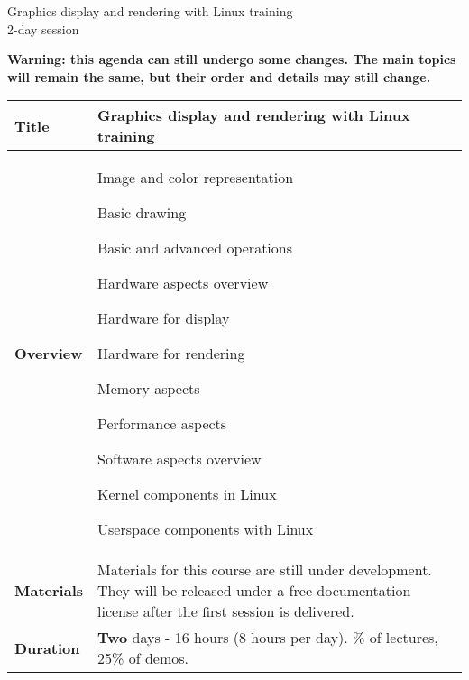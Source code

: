 \documentclass[a4paper,12pt,obeyspaces,spaces,hyphens]{article}
\begin{document}
\thispagestyle{fancy}

\setlength{\arrayrulewidth}{0.8pt}

\begin{center}
\LARGE
Graphics display and rendering with Linux training\\
\large
2-day session
\end{center}

\vspace{1cm}
{\bf Warning: this agenda can still undergo some changes.
The main topics will remain the same, but their order
and details may still change.}

\vspace{1cm}
\small
{}

 {
  \begin{tabularx}{\textwidth}{|g|h|}
    {\bf Title} & {\bf Graphics display and rendering with Linux training} \\
    \hline

    {\bf Overview} &
    Image and color representation \par
    Basic drawing \par
    Basic and advanced operations \par
    Hardware aspects overview \par
    Hardware for display \par
    Hardware for rendering \par
    Memory aspects \par
    Performance aspects \par
    Software aspects overview \par
    Kernel components in Linux \par
    Userspace components with Linux\\
    \hline
    {\bf Materials} &
     Materials for this course are still under development.
     They will be released under a free documentation license
     after the first session is delivered.\\
    \hline

    {\bf Duration} & {\bf Two} days - 16 hours (8 hours per day).
    \% of lectures, 25\% of demos. \\
    \hline


\end{tabularx}}
\end{document}
